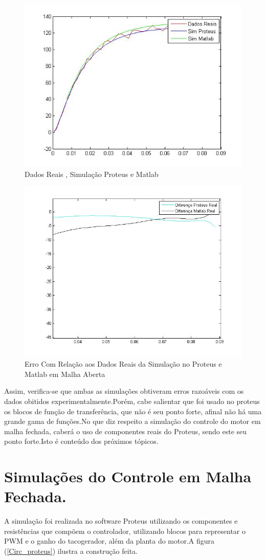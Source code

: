 \documentclass{Fabiano_file}
\begin{document}
{\begin{figure}[h!]
\centering
\includegraphics[width=.7\textwidth]{Dados_reais_matlab_proteus_malha_aberta.jpg}
\caption{Dados Reais , Simulação Proteus e Matlab}
\label{dados reais e simulacao}
\end{figure}


\begin{figure}[h!]
\centering
\includegraphics[width=.7\textwidth]{erro_malha_aberta.jpg}
\caption{Erro Com Relação aos Dados Reais da Simulação no Proteus e Matlab em Malha Aberta}
\label{erro Malhaaberta}
\end{figure}

Assim, verifica-se que ambas as simulações obtiveram erros razoáveis com os dados obitidos experimentalmente.Porém, cabe salientar que foi usado no proteus 
os blocos de função de transferência, que não é seu ponto forte, afinal não há uma grande gama de funções.No que diz respeito a simulação do controle do motor 
em malha fechada, caberá o uso de componentes reais do Proteus, sendo este seu ponto forte.Isto é conteúdo dos próximos tópicos.

\newpage

\section{Simulações do Controle em Malha Fechada.}
A simulação foi realizada no software Proteus utilizando os componentes e resistências que compõem o controlador, utilizando blocos para representar o PWM e 
o ganho do tacogerador, além da planta do motor.A figura (\ref{Circ_proteus}) ilustra a construção feita.

}
\end{document}
